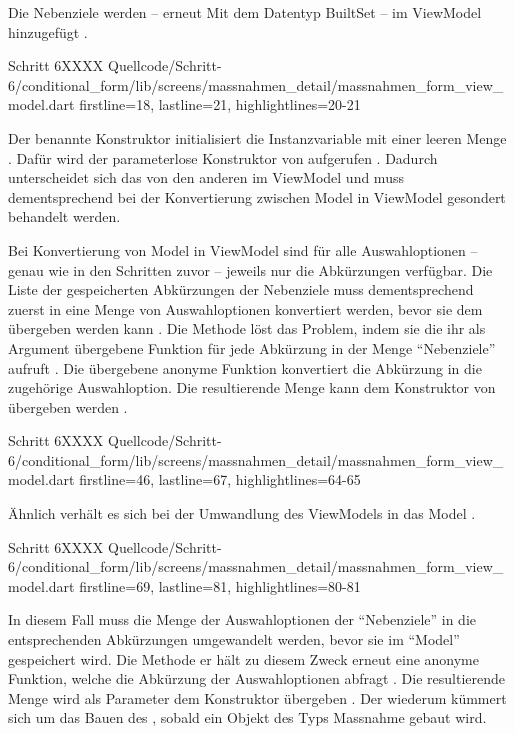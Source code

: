 Die Nebenziele werden -- erneut Mit dem Datentyp BuiltSet -- im ViewModel hinzugefügt \Lst{\ref{lst:Schritt6BehaviorSubjectNebenziele}}.
\begin{alexlisting}{Schritt 6}{XXXX}
  {Quellcode/Schritt-6/conditional_form/lib/screens/massnahmen_detail/massnahmen_form_view_model.dart}
  {firstline=18, lastline=21, highlightlines={20-21}}
  \label{lst:Schritt6BehaviorSubjectNebenziele}
\end{alexlisting}

Der benannte Konstruktor  initialisiert die Instanzvariable mit  einer leeren Menge .
Dafür wird der parameterlose Konstruktor von  aufgerufen .
Dadurch unterscheidet sich das  von den anderen im ViewModel
und muss dementsprechend bei der Konvertierung zwischen Model in ViewModel gesondert behandelt werden.

Bei Konvertierung von Model in ViewModel sind für alle Auswahloptionen -- genau wie in den Schritten zuvor -- jeweils nur die Abkürzungen verfügbar.
Die Liste der gespeicherten Abkürzungen der Nebenziele muss dementsprechend zuerst in eine Menge von Auswahloptionen konvertiert werden,
bevor sie dem  übergeben werden kann \Lst{\ref{lst:Schritt6setModel}}.
Die Methode  löst das Problem,
indem sie die ihr als Argument übergebene Funktion für jede Abkürzung in der Menge \enquote{Nebenziele} aufruft .
Die übergebene anonyme Funktion konvertiert die Abkürzung in die zugehörige Auswahloption.
Die resultierende Menge kann dem Konstruktor von  übergeben werden .

\begin{alexlisting}{Schritt 6}{XXXX}
  {Quellcode/Schritt-6/conditional_form/lib/screens/massnahmen_detail/massnahmen_form_view_model.dart}
  {firstline=46, lastline=67, highlightlines={64-65}}
  \label{lst:Schritt6setModel}
\end{alexlisting}


Ähnlich verhält es sich bei der Umwandlung des ViewModels in das Model \Lst{\ref{lst:Schritt6nebenzieleSetBuilder}}.

\begin{alexlisting}{Schritt 6}{XXXX}
  {Quellcode/Schritt-6/conditional_form/lib/screens/massnahmen_detail/massnahmen_form_view_model.dart}
  {firstline=69, lastline=81, highlightlines={80-81}}
  \label{lst:Schritt6nebenzieleSetBuilder}
\end{alexlisting}

In diesem Fall muss die Menge der Auswahloptionen der \enquote{Nebenziele} in die entsprechenden Abkürzungen umgewandelt werden,
bevor sie im \enquote{Model} gespeichert wird.
Die Methode  er hält zu diesem Zweck erneut eine anonyme Funktion,
welche die Abkürzung der Auswahloptionen abfragt .
Die resultierende Menge wird als Parameter dem Konstruktor  übergeben .
Der  wiederum kümmert sich um das Bauen des , sobald ein Objekt des Typs Massnahme gebaut wird.



